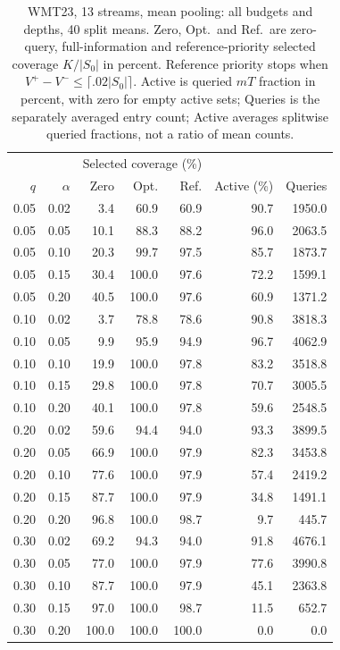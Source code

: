 \begin{table}[t]
\centering\small
\begin{tabular}{rrrrrrr}
\toprule
 & & \multicolumn{3}{c}{Selected coverage (\%)} & & \\
$q$ & $\alpha$ & Zero & Opt. & Ref. & Active (\%) & Queries \\
\midrule
0.05 & 0.02 & 3.4 & 60.9 & 60.9 & 90.7 & 1950.0 \\
0.05 & 0.05 & 10.1 & 88.3 & 88.2 & 96.0 & 2063.5 \\
0.05 & 0.10 & 20.3 & 99.7 & 97.5 & 85.7 & 1873.7 \\
0.05 & 0.15 & 30.4 & 100.0 & 97.6 & 72.2 & 1599.1 \\
0.05 & 0.20 & 40.5 & 100.0 & 97.6 & 60.9 & 1371.2 \\
0.10 & 0.02 & 3.7 & 78.8 & 78.6 & 90.8 & 3818.3 \\
0.10 & 0.05 & 9.9 & 95.9 & 94.9 & 96.7 & 4062.9 \\
0.10 & 0.10 & 19.9 & 100.0 & 97.8 & 83.2 & 3518.8 \\
0.10 & 0.15 & 29.8 & 100.0 & 97.8 & 70.7 & 3005.5 \\
0.10 & 0.20 & 40.1 & 100.0 & 97.8 & 59.6 & 2548.5 \\
0.20 & 0.02 & 59.6 & 94.4 & 94.0 & 93.3 & 3899.5 \\
0.20 & 0.05 & 66.9 & 100.0 & 97.9 & 82.3 & 3453.8 \\
0.20 & 0.10 & 77.6 & 100.0 & 97.9 & 57.4 & 2419.2 \\
0.20 & 0.15 & 87.7 & 100.0 & 97.9 & 34.8 & 1491.1 \\
0.20 & 0.20 & 96.8 & 100.0 & 98.7 & 9.7 & 445.7 \\
0.30 & 0.02 & 69.2 & 94.3 & 94.0 & 91.8 & 4676.1 \\
0.30 & 0.05 & 77.0 & 100.0 & 97.9 & 77.6 & 3990.8 \\
0.30 & 0.10 & 87.7 & 100.0 & 97.9 & 45.1 & 2363.8 \\
0.30 & 0.15 & 97.0 & 100.0 & 98.7 & 11.5 & 652.7 \\
0.30 & 0.20 & 100.0 & 100.0 & 100.0 & 0.0 & 0.0 \\
\bottomrule
\end{tabular}
\caption{WMT23, 13 streams, mean pooling: all budgets and depths, 40 split means. Zero, Opt.\ and Ref.\ are zero-query, full-information and reference-priority selected coverage $K/|S_0|$ in percent. Reference priority stops when $V^+-V^-\le\lceil.02|S_0|\rceil$. Active is queried $mT$ fraction in percent, with zero for empty active sets; Queries is the separately averaged entry count; Active averages splitwise queried fractions, not a ratio of mean counts.}
\label{tab:review-budget-1-mean}
\end{table}
